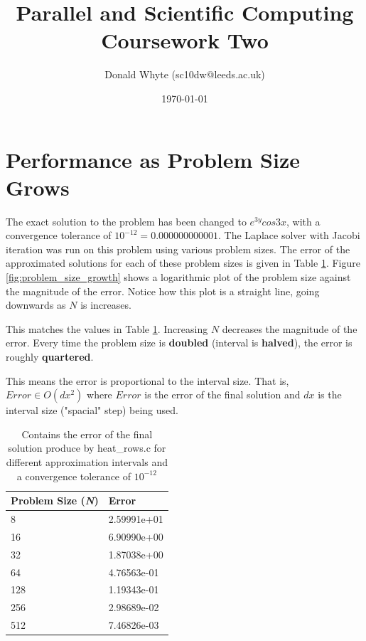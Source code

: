 \documentclass{article}
\title{Parallel and Scientific Computing \\ Coursework Two}
\author{Donald Whyte (sc10dw@leeds.ac.uk)}
\date{\today}
\begin{document}
\maketitle

\tableofcontents

\pagebreak

\section{Performance as Problem Size Grows}

The exact solution to the problem has been changed to $e^{3y}cos{3x}$, with a convergence tolerance of $10^{-12} = 0.000000000001$. The Laplace solver with Jacobi iteration was run on this problem using various problem sizes. The error of the approximated solutions for each of these problem sizes is given in Table \ref{tab:problem_size_growth}. Figure \ref{fig:problem_size_growth} shows a logarithmic plot of the problem size against the magnitude of the error. Notice how this plot is a straight line, going downwards as $N$ is increases.

This matches the values in Table \ref{tab:problem_size_growth}. Increasing $N$ decreases the magnitude of the error. Every time the problem size is \textbf{doubled} (interval is \textbf{halved}), the error is roughly \textbf{quartered}.

This means the error is proportional to the interval size. That is, $Error \in O(dx^2)$ where $Error$ is the error of the final solution and $dx$ is the interval size ("spacial" step) being used.

\begin{table}
	\centering
	\begin{tabular}{|l|l|}
	\hline
	\textbf{Problem Size (\textit{N})} & \textbf{Error} \\
	\hline
	8 & 2.59991e+01 \\
	16 & 6.90990e+00 \\
	32 & 1.87038e+00 \\
	64 & 4.76563e-01 \\
	128 & 1.19343e-01 \\
	256 & 2.98689e-02 \\
	512 & 7.46826e-03 \\
	\hline
	\end{tabular}
	\caption{Contains the error of the final solution produce by heat\_rows.c for different approximation intervals and a convergence tolerance of $10^{-12}$}
	\label{tab:problem_size_growth}
\end{table}
\end{document}
